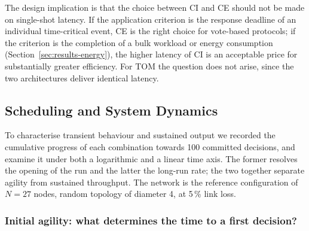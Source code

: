 \documentclass[journal]{IEEEtran}
\newcommand{\CI}{CI}                      %
\newcommand{\CE}{CE}                      %
\newcommand{\Nnodes}{N}                   %
\begin{document}
The design implication is that the choice between \CI{} and \CE{} should
not be made on single-shot latency. If the application criterion is the
response deadline of an individual time-critical event, \CE{} is the
right choice for vote-based protocols; if the criterion is the completion
of a bulk workload or energy consumption
(Section~\ref{sec:results-energy}), the higher latency of \CI{} is an
acceptable price for substantially greater efficiency. For TOM the
question does not arise, since the two architectures deliver identical
latency.

\subsection{Scheduling and System Dynamics}
\label{sec:results-dynamics}

To characterise transient behaviour and sustained output we recorded the
cumulative progress of each combination towards 100 committed decisions,
and examine it under both a logarithmic and a linear time axis. The former
resolves the opening of the run and the latter the long-run rate; the two
together separate agility from sustained throughput. The network is the
reference configuration of $\Nnodes = 27$ nodes, random topology of
diameter 4, at 5\,\% link loss.

\subsubsection{Initial agility: what determines the time to a first
decision?}

\end{document}
